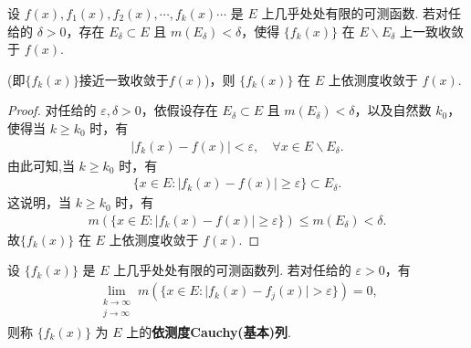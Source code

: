 \documentclass[../../main.tex]{subfiles}%
\begin{document}
\begin{theorem}\label{theorem:定理3.15}
设 $f(x),f_1(x),f_2(x),\cdots,f_k(x)\cdots$ 是 $E$ 上几乎处处有限的可测函数. 若对任给的 $\delta>0$，存在 $E_\delta\subset E$ 且 $m(E_\delta)<\delta$，使得 $\{f_k(x)\}$ 在 $E\backslash E_\delta$ 上一致收敛于 $f(x)$.

(即$\{f_k(x)\}$接近一致收敛于$f(x)$)，则 $\{f_k(x)\}$ 在 $E$ 上依测度收敛于 $f(x)$.
\end{theorem}
\begin{proof}

对任给的 $\varepsilon,\delta>0$，依假设存在 $E_\delta\subset E$ 且 $m(E_\delta)<\delta$，以及自然数 $k_0$，使得当 $k\geqslant k_0$ 时，有
\begin{align*}
\vert f_k(x)-f(x)\vert<\varepsilon,\quad \forall x\in E\backslash E_\delta.
\end{align*}
由此可知,当 $k\geqslant k_0$ 时，有
\begin{align*}
\{x\in E:\vert f_k(x)-f(x)\vert\geqslant\varepsilon\}\subset E_\delta.
\end{align*}
这说明，当 $k\geqslant k_0$ 时，有
\begin{align*}
m(\{x\in E:\vert f_k(x)-f(x)\vert\geqslant\varepsilon\})\leqslant m(E_\delta)<\delta.
\end{align*}
故$\{f_k(x)\}$ 在 $E$ 上依测度收敛于 $f(x)$.

\end{proof}

\begin{definition}[依测度Cauchy(基本)列]
设 $\{f_k(x)\}$ 是 $E$ 上几乎处处有限的可测函数列. 若对任给的 $\varepsilon>0$，有
\begin{align*}
\lim_{\substack{k\to\infty\\j\to\infty}}m(\{x\in E:\vert f_k(x)-f_j(x)\vert>\varepsilon\}) = 0,
\end{align*}
则称 $\{f_k(x)\}$ 为 $E$ 上的\textbf{依测度Cauchy(基本)列}.
\end{definition}
\end{document}
